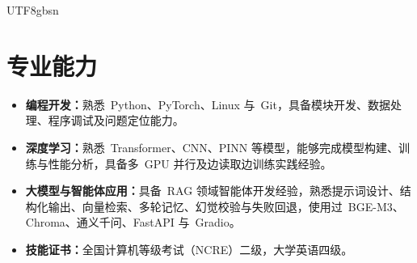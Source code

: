 \documentclass[10.5pt,a4paper]{article}
\newcommand{\resumeItem}[1]{\item #1}
\begin{document}
\begin{CJK*}{UTF8}{gbsn}
\begin{itemize}
\end{itemize}

\section*{专业能力}

\begin{itemize}

\resumeItem{\textbf{编程开发：}熟悉\ Python、PyTorch、Linux 与\ Git，具备模块开发、数据处理、程序调试及问题定位能力。}

\resumeItem{\textbf{深度学习：}熟悉\ Transformer、CNN、PINN 等模型，能够完成模型构建、训练与性能分析，具备多\ GPU 并行及边读取边训练实践经验。}

\resumeItem{\textbf{大模型与智能体应用：}具备\ RAG 领域智能体开发经验，熟悉提示词设计、结构化输出、向量检索、多轮记忆、幻觉校验与失败回退，使用过\ BGE-M3、Chroma、通义千问、FastAPI 与\ Gradio。}

\resumeItem{\textbf{技能证书：}全国计算机等级考试（NCRE）二级，大学英语四级。}


\end{itemize}

\end{CJK*}
\end{document}
